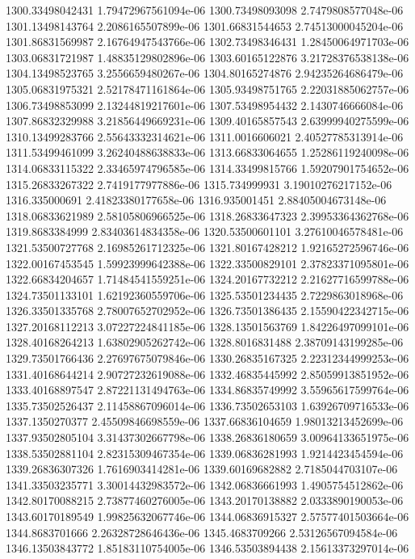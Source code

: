 {1300.33498042431 1.79472967561094e-06
1300.73498093098 2.7479808577048e-06
1301.13498143764 2.2086165507899e-06
1301.66831544653 2.74513000045204e-06
1301.86831569987 2.16764947543766e-06
1302.73498346431 1.28450064971703e-06
1303.06831721987 1.48835129802896e-06
1303.60165122876 3.21728376538138e-06
1304.13498523765 3.2556659480267e-06
1304.80165274876 2.94235264686479e-06
1305.06831975321 2.52178471161864e-06
1305.93498751765 2.22031885062757e-06
1306.73498853099 2.13244819217601e-06
1307.53498954432 2.1430746666084e-06
1307.86832329988 3.21856449669231e-06
1309.40165857543 2.63999940275599e-06
1310.13499283766 2.55643332314621e-06
1311.0016606021 2.40527785313914e-06
1311.53499461099 3.26240488638833e-06
1313.66833064655 1.25286119240098e-06
1314.06833115322 2.33465974796585e-06
1314.33499815766 1.59207901754652e-06
1315.26833267322 2.7419177977886e-06
1315.734999931 3.19010276217152e-06
1316.335000691 2.41823380177658e-06
1316.935001451 2.88405004673148e-06
1318.06833621989 2.58105806966525e-06
1318.26833647323 2.39953364362768e-06
1319.8683384999 2.83403614834358e-06
1320.53500601101 3.27610046578481e-06
1321.53500727768 2.16985261712325e-06
1321.80167428212 1.92165272596746e-06
1322.00167453545 1.59923999642388e-06
1322.33500829101 2.37823371095801e-06
1322.66834204657 1.71484541559251e-06
1324.20167732212 2.21627716599788e-06
1324.73501133101 1.62192360559706e-06
1325.53501234435 2.7229863018968e-06
1326.33501335768 2.78007652702952e-06
1326.73501386435 2.15590422342715e-06
1327.20168112213 3.07227224841185e-06
1328.13501563769 1.84226497099101e-06
1328.40168264213 1.63802905262742e-06
1328.8016831488 2.38709143199285e-06
1329.73501766436 2.27697675079846e-06
1330.26835167325 2.22312344999253e-06
1331.40168644214 2.90727232619088e-06
1332.46835445992 2.85059913851952e-06
1333.40168897547 2.87221131494763e-06
1334.86835749992 3.55965617599764e-06
1335.73502526437 2.11458867096014e-06
1336.73502653103 1.63926709716533e-06
1337.1350270377 2.45509846698559e-06
1337.66836104659 1.98013213452699e-06
1337.93502805104 3.31437302667798e-06
1338.26836180659 3.00964133651975e-06
1338.53502881104 2.82315309467354e-06
1339.06836281993 1.9214423454594e-06
1339.26836307326 1.7616903414281e-06
1339.60169682882 2.7185044703107e-06
1341.33503235771 3.30014432983572e-06
1342.06836661993 1.4905754512862e-06
1342.80170088215 2.73877460276005e-06
1343.20170138882 2.0333890190053e-06
1343.60170189549 1.99825632067746e-06
1344.06836915327 2.57577401503664e-06
1344.8683701666 2.26328728646436e-06
1345.4683709266 2.53126567094584e-06
1346.13503843772 1.85183110754005e-06
1346.53503894438 2.15613373297014e-06
}
